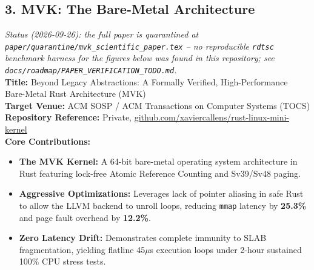 \documentclass[11pt,a4paper]{article}
\begin{document}
\subsection{3. MVK: The Bare-Metal Architecture}
\textit{\small Status (2026-09-26): the full paper is quarantined at \texttt{paper/quarantine/mvk\_scientific\_paper.tex} -- no reproducible \texttt{rdtsc} benchmark harness for the figures below was found in this repository; see \texttt{docs/roadmap/PAPER\_VERIFICATION\_TODO.md}.} \\
\textbf{Title:} Beyond Legacy Abstractions: A Formally Verified, High-Performance Bare-Metal Rust Architecture (MVK) \\
\textbf{Target Venue:} ACM SOSP / ACM Transactions on Computer Systems (TOCS) \\
\textbf{Repository Reference:} Private, \url{github.com/xaviercallens/rust-linux-mini-kernel} \\
\textbf{Core Contributions:}
\begin{itemize}
    \item \textbf{The MVK Kernel:} A 64-bit bare-metal operating system architecture in Rust featuring lock-free Atomic Reference Counting and Sv39/Sv48 paging.
    \item \textbf{Aggressive Optimizations:} Leverages lack of pointer aliasing in safe Rust to allow the LLVM backend to unroll loops, reducing \texttt{mmap} latency by \textbf{25.3\%} and page fault overhead by \textbf{12.2\%}.
    \item \textbf{Zero Latency Drift:} Demonstrates complete immunity to SLAB fragmentation, yielding flatline 45$\mu$s execution loops under 2-hour sustained 100\% CPU stress tests.
\end{itemize}
\end{document}
